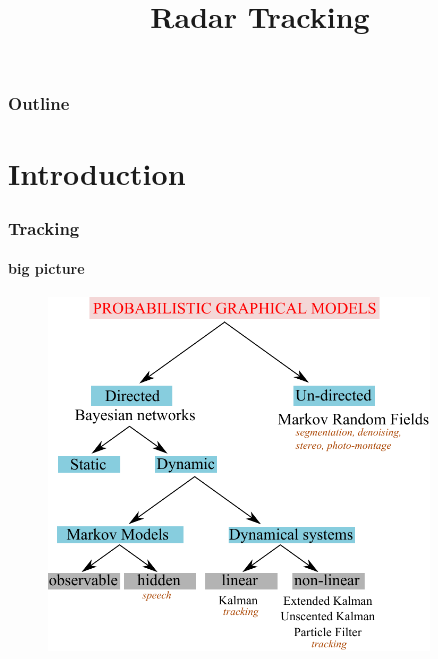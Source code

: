 
\title{Radar Tracking}
\begin{frame}[plain]\logoTechTower
	\titlepage
\end{frame}

\begin{frame}
\frametitle{Outline}
\logoCSIPCPL\logoTechTower
	\tableofcontents
\end{frame}



\section{Introduction}
\begin{frame}
\frametitle{Tracking}
\framesubtitle{big picture}
\logoCSIPCPL\mypagenum
	\begin{figure}
		\includegraphics[width=0.9\textwidth]{figs/PRML_PGM_overview.pdf}
	\end{figure}
\end{frame}





